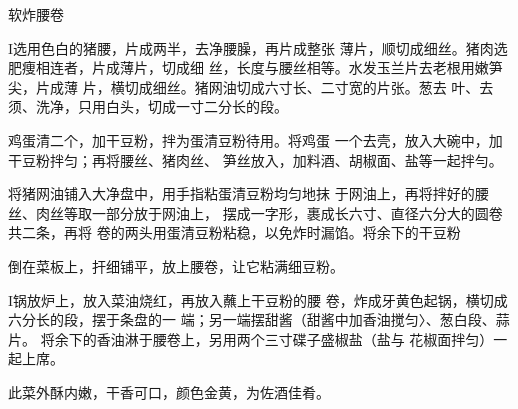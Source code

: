 \begin{recipe}{软炸腰卷}

\ingredients



\cooking

I选用色白的猪腰，片成两半，去净腰臊，再片成整张 薄片，顺切成细丝。猪肉选肥痩相连者，片成薄片，切成细 丝，长度与腰丝相等。水发玉兰片去老根用嫩笋尖，片成薄 片，横切成细丝。猪网油切成六寸长、二寸宽的片张。葱去 叶、去须、洗净，只用白头，切成一寸二分长的段。

\step 	鸡蛋清二个，加干豆粉，拌为蛋清豆粉待用。将鸡蛋 一个去壳，放入大碗中，加干豆粉拌匀；再将腰丝、猪肉丝、 笋丝放入，加料酒、胡椒面、盐等一起拌勻。

\step 	将猪网油铺入大净盘中，用手指粘蛋清豆粉均匀地抹 于网油上，再将拌好的腰丝、肉丝等取一部分放于网油上， 摆成一字形，裹成长六寸、直径六分大的圆卷共二条，再将 卷的两头用蛋清豆粉粘稳，以免炸时漏馅。将余下的干豆粉

倒在菜板上，扞细铺平，放上腰卷，让它粘满细豆粉。

I锅放炉上，放入菜油烧红，再放入蘸上干豆粉的腰 卷，炸成牙黄色起锅，横切成六分长的段，摆于条盘的一 端；另一端摆甜酱（甜酱中加香油搅匀〉、葱白段、蒜片。 将余下的香油淋于腰卷上，另用两个三寸碟子盛椒盐（盐与 花椒面拌匀）一起上席。

\notes

此菜外酥内嫩，干香可口，颜色金黄，为佐酒佳肴。

\end{recipe}

